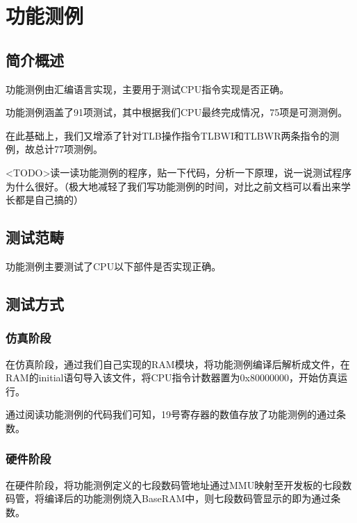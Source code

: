 \chapter{功能测例}

\section{简介概述}

功能测例由汇编语言实现，主要用于测试CPU指令实现是否正确。

功能测例涵盖了91项测试，其中根据我们CPU最终完成情况，75项是可测测例。

在此基础上，我们又增添了针对TLB操作指令TLBWI和TLBWR两条指令的测例，故总计77项测例。

<TODO>读一读功能测例的程序，贴一下代码，分析一下原理，说一说测试程序为什么很好。（极大地减轻了我们写功能测例的时间，对比之前文档可以看出来学长都是自己搞的）

\section{测试范畴}

功能测例主要测试了CPU以下部件是否实现正确。

    \begin{enumerate}
    \end{enumerate}

\section{测试方式}

\subsection{仿真阶段}

在仿真阶段，通过我们自己实现的RAM模块，将功能测例编译后解析成文件，在RAM的initial语句导入该文件，将CPU指令计数器置为0x80000000，开始仿真运行。

通过阅读功能测例的代码我们可知，19号寄存器的数值存放了功能测例的通过条数。

\subsection{硬件阶段}

在硬件阶段，将功能测例定义的七段数码管地址通过MMU映射至开发板的七段数码管，将编译后的功能测例烧入BaseRAM中，则七段数码管显示的即为通过条数。

